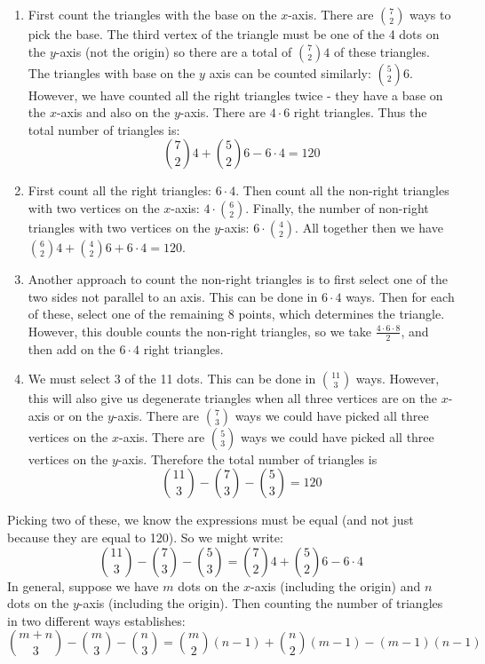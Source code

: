 \begin{questions}
\begin{solution}
   \begin{enumerate}
     \item First count the triangles with the base on the $x$-axis.  There are ${7 \choose 2}$ ways to pick the base.  The third vertex of the triangle must be one of the 4 dots on the $y$-axis (not the origin) so there are a total of ${7 \choose 2}4$ of these triangles.  The triangles with base on the $y$ axis can be counted similarly: ${5 \choose 2}6$.  However, we have counted all the right triangles twice - they have a base on the $x$-axis and also on the $y$-axis.  There are $4 \cdot 6$ right triangles.  Thus the total number of triangles is:
     \[{7 \choose 2}4 + {5 \choose 2}6 - 6\cdot 4 = 120\]
 		\item First count all the right triangles: $6 \cdot 4$.  Then count all the non-right triangles with two vertices on the $x$-axis: $4 \cdot {6 \choose 2}$.  Finally, the number of non-right triangles with two vertices on the $y$-axis: $6 \cdot {4 \choose 2}$.  All together then we have ${6 \choose 2}4 + {4 \choose 2}6 + 6 \cdot 4 = 120$.
 		\item Another approach to count the non-right triangles is to first select one of the two sides not parallel to an axis.  This can be done in $6 \cdot 4$ ways.  Then for each of these, select one of the remaining 8 points, which determines the triangle.  However, this double counts the non-right triangles, so we take $\frac{4\cdot 6 \cdot 8}{2}$, and then add on the $6\cdot 4$ right triangles.
     \item We must select 3 of the 11 dots.  This can be done in ${11 \choose 3}$ ways.  However, this will also give us degenerate triangles when all three vertices are on the $x$-axis or on the $y$-axis.  There are ${7 \choose 3}$ ways we could have picked all three vertices on the $x$-axis.  There are ${5 \choose 3}$ ways we could have picked all three vertices on the $y$-axis.  Therefore the total number of triangles is
     \[{11 \choose 3} - {7 \choose 3} - {5 \choose 3} = 120\]
   \end{enumerate}

 	Picking two of these, we know the expressions must be equal (and not just because they are equal to 120).  So we might write:
 	\[{11 \choose 3} - {7 \choose 3} - {5 \choose 3} = {7 \choose 2}4 + {5 \choose 2}6 - 6\cdot 4\]
 	In general, suppose we have $m$ dots on the $x$-axis (including the origin) and $n$ dots on the $y$-axis (including the origin).  Then counting the number of triangles in two different ways establishes:
 	\[{m+n \choose 3} - {m \choose 3} - {n \choose 3} = {m \choose 2}(n-1) + {n \choose 2}(m-1) - (m-1)(n-1)\]
 \end{solution}






\end{questions}
